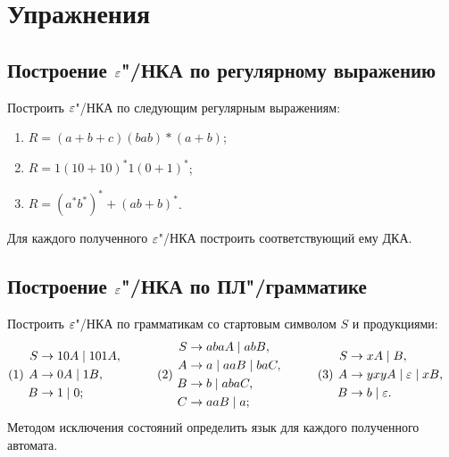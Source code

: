\section{Упражнения}
\label{Chapter4Exs}

\subsection*{Построение $\varepsilon$"/НКА по регулярному выражению}

Построить $\varepsilon$"/НКА по следующим регулярным выражениям:
\begin{enumerate}
	\item $R = (a+b+c)(bab)*(a+b)$;
  \item $R = 1(10+10)^*1(0+1)^*$;
  \item $R = (a^*b^*)^*+(ab+b)^*$.
\end{enumerate}
Для каждого полученного $\varepsilon$"/НКА построить соответствующий ему ДКА. 
\subsection*{Построение $\varepsilon$"/НКА по ПЛ"/грамматике}
Построить $\varepsilon$"/НКА по грамматикам со стартовым символом $S$ и продукциями:
\begin{align*}
    \text{(1) }&
        \begin{aligned}%
            S &\to 10A \mid 101A,\\
            A &\to 0A \mid 1B,\\
            B &\to 1 \mid 0;
        \end{aligned}
        \qquad
    &
    \text{(2) }&
        \begin{aligned}%
            S &\to abaA \mid abB,\\
            A &\to a \mid aaB \mid baC,\\
            B &\to b \mid abaC,\\
            C &\to aaB \mid a;
		        \end{aligned}
        \qquad
    &
    \text{(3) }&
        \begin{aligned}%
            S &\to xA \mid B,\\
            A &\to yxyA \mid \eps \mid xB,\\
            B &\to b \mid \eps.
        \end{aligned}
\end{align*}
Методом исключения состояний определить язык для каждого полученного автомата.
